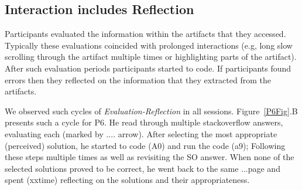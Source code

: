 



\subsection{Interaction includes Reflection}


Participants evaluated the information within the artifacts that they accessed. Typically these evaluations coincided with prolonged interactions (e.g, long slow scrolling through the artifact multiple times or highlighting parts of the artifact). After such evaluation periods participants started to code. If participants found errors then they reflected on the information that they extracted from the artifacts.

We observed such cycles of \textit{Evaluation-Reflection} in all sessions. Figure~\ref{P6Fig}.B presents such a cycle for P6. He read through multiple stackoverflow answers, evaluating each (marked by .... arrow). After selecting the most appropriate (perceived) solution, he started to code (A0) and run the code (a9); Following these steps multiple times as well as revisiting the SO answer. When none of the selected solutions proved to be correct, he went back to the same ...page and spent (xxtime) reflecting on the solutions and their appropriateness.

